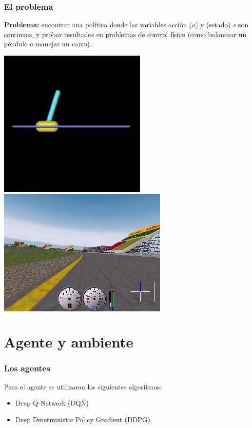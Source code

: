 \documentclass[
    11pt,
    aspectratio=169,
]{beamer}
\begin{document}
\begin{frame}
\frametitle{El problema}

\textbf{Problema:} encontrar una política donde las variables acción ($a$) y (estado) $s$ son continuas, y probar resultados en problemas de control físico (como balancear un péndulo o manejar un carro).

\begin{center}
\includegraphics[scale=0.4]{Images/cartpole}
\includegraphics[scale=0.4]{Images/car_driving}
\end{center}

\end{frame}

\section{Agente y ambiente}

\begin{frame}
\frametitle{Los agentes}

Para el agente se utilizaron los siguientes algoritmos:

\begin{itemize}
\item Deep Q-Network (DQN)
\item Deep Deterministic Policy Gradient (DDPG)
\end{itemize}

\end{frame}
\end{document}

